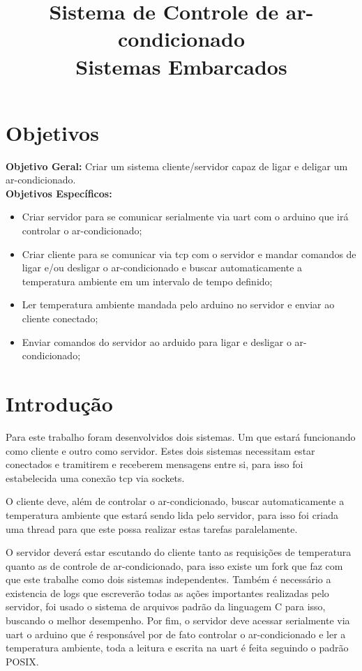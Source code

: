 \documentclass[journal,transmag]{IEEEtran}
\begin{document}
\title{Sistema de Controle de ar-condicionado\\ Sistemas Embarcados}

\author{}


\maketitle

\section{Objetivos}

\textbf{Objetivo Geral:} Criar um sistema cliente/servidor capaz de ligar e deligar um ar-condicionado.
\\

\textbf{Objetivos Específicos:}
\begin{itemize}
	\item Criar servidor para se comunicar serialmente via uart com o arduino que irá controlar o ar-condicionado;
	\item Criar cliente para se comunicar via tcp com o servidor e mandar comandos de ligar e/ou desligar o ar-condicionado e buscar automaticamente a temperatura ambiente em um intervalo de tempo definido;
	\item Ler temperatura ambiente mandada pelo arduino no servidor e enviar ao cliente conectado;
	\item Enviar comandos do servidor ao arduido para ligar e desligar o ar-condicionado;
\end{itemize}

\section{Introdução}
Para este trabalho foram desenvolvidos dois sistemas. Um que estará funcionando como cliente e outro como servidor. Estes dois sistemas necessitam estar conectados e tramitirem e receberem mensagens entre si, para isso foi estabelecida uma conexão tcp via sockets.

O cliente deve, além de controlar o ar-condicionado, buscar automaticamente a temperatura ambiente que estará sendo lida pelo servidor, para isso foi criada uma thread para que este possa realizar estas tarefas paralelamente. 

O servidor deverá estar escutando do cliente tanto as requisições de temperatura quanto as de controle de ar-condicionado, para isso existe um fork que faz com que este trabalhe como dois sistemas independentes. Também é necessário a existencia de logs que escreverão todas as ações importantes realizadas pelo servidor, foi usado o sistema de arquivos padrão da linguagem C para isso, buscando o melhor desempenho. Por fim, o servidor deve acessar serialmente via uart o arduino que é responsável por de fato controlar o ar-condicionado e ler a temperatura ambiente, toda a leitura e escrita na uart é feita seguindo o padrão POSIX.
\end{document}
